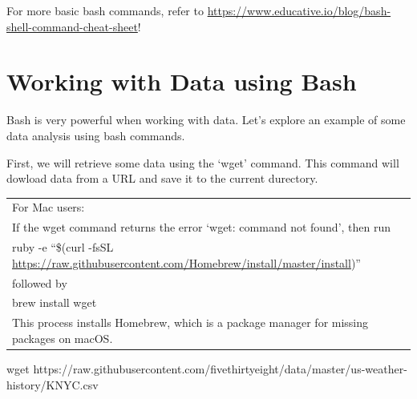 \documentclass[]{book}
\newenvironment{Shaded}{\begin{snugshade}}{\end{snugshade}}
\newcommand{\FunctionTok}[1]{\textcolor[rgb]{0.00,0.00,0.00}{#1}}
\newcommand{\NormalTok}[1]{#1}
\begin{document}
For more basic bash commands, refer to
\url{https://www.educative.io/blog/bash-shell-command-cheat-sheet}!

\section{Working with Data using
Bash}\label{working-with-data-using-bash}

Bash is very powerful when working with data. Let's explore an example
of some data analysis using bash commands.

First, we will retrieve some data using the `wget' command. This command
will dowload data from a URL and save it to the current durectory.

\begin{longtable}[]{@{}l@{}}
\toprule
\begin{minipage}[t]{0.03\columnwidth}\raggedright\strut
For Mac users:\strut
\end{minipage}\tabularnewline
\begin{minipage}[t]{0.03\columnwidth}\raggedright\strut
If the wget command returns the error `wget: command not found', then
run\strut
\end{minipage}\tabularnewline
\begin{minipage}[t]{0.03\columnwidth}\raggedright\strut
ruby -e ``\$(curl -fsSL
\url{https://raw.githubusercontent.com/Homebrew/install/master/install})''\strut
\end{minipage}\tabularnewline
\begin{minipage}[t]{0.03\columnwidth}\raggedright\strut
followed by\strut
\end{minipage}\tabularnewline
\begin{minipage}[t]{0.03\columnwidth}\raggedright\strut
brew install wget\strut
\end{minipage}\tabularnewline
\begin{minipage}[t]{0.03\columnwidth}\raggedright\strut
This process installs Homebrew, which is a package manager for missing
packages on macOS.\strut
\end{minipage}\tabularnewline
\bottomrule
\end{longtable}

\begin{Shaded}
\begin{Highlighting}[]
\FunctionTok{wget}\NormalTok{ https://raw.githubusercontent.com/fivethirtyeight/data/master/us-weather-history/KNYC.csv}
\end{Highlighting}
\end{Shaded}
\end{document}
